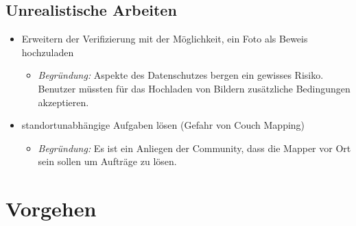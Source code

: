 \subsection{Unrealistische Arbeiten}
\begin{itemize}
	\item Erweitern der Verifizierung mit der Möglichkeit, ein Foto als Beweis hochzuladen
	\begin{itemize}
	  \item \emph{Begründung:} Aspekte des Datenschutzes bergen ein gewisses Risiko. Benutzer müssten für das Hochladen von Bildern zusätzliche Bedingungen akzeptieren.
	\end{itemize}
	\item standortunabhängige Aufgaben lösen (Gefahr von Couch Mapping)
	\begin{itemize}
	  \item \emph{Begründung:} Es ist ein Anliegen der  Community, dass die Mapper vor Ort sein sollen um Aufträge zu lösen. 
	\end{itemize}
\end{itemize}

\section{Vorgehen}

